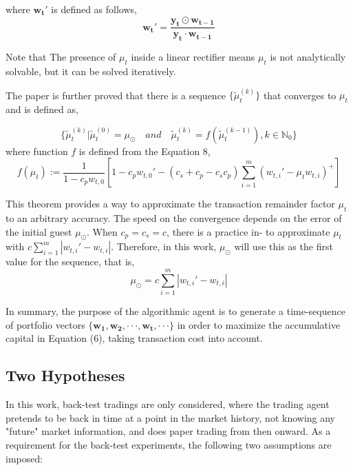 \documentclass[journal,onecolumn]{IEEEtran}
\newcommand{\vc}[1]{\mathbf{#1}}
\begin{document}
where $\vc{w_t'}$ is defined as follows,
\begin{equation}
\vc{w_t'}= \frac{\vc{y_t \odot \vc{w_{t-1}}}}{\vc{y_t \cdot \vc{w_{t-1}}}}
\end{equation}

Note that The presence of $\mu_t$ inside a linear rectifier means $\mu_t$ is not analytically solvable, but it can be solved iteratively.

The paper is further proved that there is a sequence $\{\tilde{\mu}_t^{(k)}\}$ that converges to $\mu_t$ and is defined as,

\begin{equation}
	\{\tilde{\mu}_t^{(k)} | \tilde{\mu}_t^{(0)} = \mu_{\odot}  \quad and \quad \tilde{\mu}_t^{(k)} = f(\tilde{\mu}_t^{(k-1)}) , k \in \mathbb{N}_0 \}
\end{equation}
where function $f$ is defined from the Equation 8,
\begin{equation}
f(\mu_t) := \frac{1}{1-c_pw_{t,0}}[1-c_p w_{t,0}' - (c_s+c_p-c_s c_p)\sum_{i=1}^{m}(w_{t,i}'-\mu_t w_{t,i})^+ ]
\end{equation}

This theorem provides a way to approximate the transaction remainder
factor $\mu_t$ to an arbitrary accuracy. The speed on the convergence depends on the error of the initial guest $\mu_{\odot}$.
When $c_p = c_s = c$, there is a practice in-\cite{Moody2001} to approximate $\mu_t$ with $c\sum_{i=1}^{m}|w_{t,i}'-w_{t,i}|$. Therefore, in this work, $\mu_{\odot}$ will use this as the first value for the sequence,
that is, 
\begin{equation}
	\mu_{\odot} = c\sum_{i=1}^{m}|w_{t,i}'-w_{t,i}|
\end{equation}

In summary, the purpose of the algorithmic agent is to generate a time-sequence of portfolio vectors $\{\vc{w_1}, \vc{w_2}, · · · , \vc{w_t}, · · · \}$ in order to maximize the accumulative capital in Equation (6), taking transaction cost into account.

\subsection{Two Hypotheses}
In this work, back-test tradings are only considered, where the trading agent pretends to be
back in time at a point in the market history, not knowing any "future" market information,
and does paper trading from then onward. As a requirement for the back-test experiments,
the following two assumptions are imposed:
\end{document}
